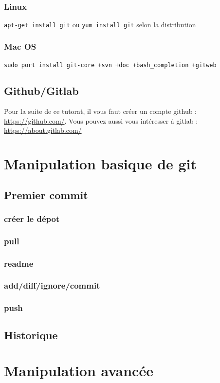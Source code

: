 \documentclass[a4paper,10pt]{article}
\begin{document}
    \subsubsection{Linux}
\verb|apt-get install git| ou \verb|yum install git| selon la distribution
    \subsubsection{Mac OS}
\verb|sudo port install git-core +svn +doc +bash_completion +gitweb|
  \subsection{Github/Gitlab}
Pour la suite de ce tutorat, il vous faut créer un compte github : \url{https://github.com/}.
Vous pouvez aussi vous intéresser à gitlab : \url{https://about.gitlab.com/}
\section{Manipulation basique de git}
  \subsection{Premier commit}
     \subsubsection{créer le dépot}
     \subsubsection{pull}
     \subsubsection{readme}
     \subsubsection{add/diff/ignore/commit}
     \subsubsection{push}
  \subsection{Historique}
\section{Manipulation avancée}
\end{document}
